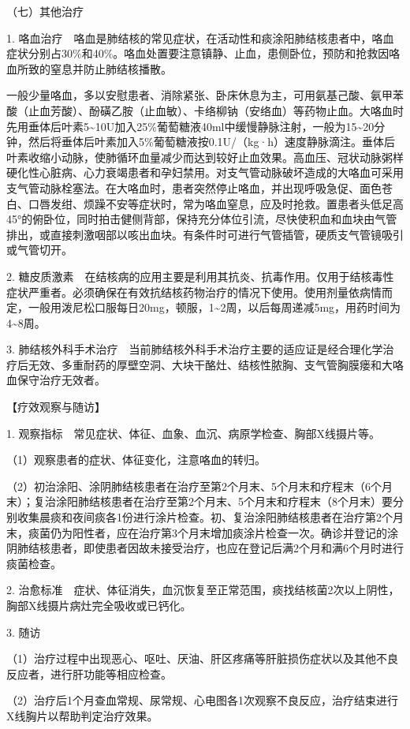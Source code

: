 {（七）其他治疗}

1.
咯血治疗　咯血是肺结核的常见症状，在活动性和痰涂阳肺结核患者中，咯血症状分别占30\%和40\%。咯血处置要注意镇静、止血，患侧卧位，预防和抢救因咯血所致的窒息并防止肺结核播散。

一般少量咯血，多以安慰患者、消除紧张、卧床休息为主，可用氨基己酸、氨甲苯酸（止血芳酸）、酚磺乙胺（止血敏）、卡络柳钠（安络血）等药物止血。大咯血时先用垂体后叶素5\textasciitilde{}10U加入25\%葡萄糖液40ml中缓慢静脉注射，一般为15\textasciitilde{}20分钟，然后将垂体后叶素加入5\%葡萄糖液按0.1U/（kg·h）速度静脉滴注。垂体后叶素收缩小动脉，使肺循环血量减少而达到较好止血效果。高血压、冠状动脉粥样硬化性心脏病、心力衰竭患者和孕妇禁用。对支气管动脉破坏造成的大咯血可采用支气管动脉栓塞法。在大咯血时，患者突然停止咯血，并出现呼吸急促、面色苍白、口唇发绀、烦躁不安等症状时，常为咯血窒息，应及时抢救。置患者头低足高45°的俯卧位，同时拍击健侧背部，保持充分体位引流，尽快使积血和血块由气管排出，或直接刺激咽部以咳出血块。有条件时可进行气管插管，硬质支气管镜吸引或气管切开。

2.
糖皮质激素　在结核病的应用主要是利用其抗炎、抗毒作用。仅用于结核毒性症状严重者。必须确保在有效抗结核药物治疗的情况下使用。使用剂量依病情而定，一般用泼尼松口服每日20mg，顿服，1\textasciitilde{}2周，以后每周递减5mg，用药时间为4\textasciitilde{}8周。

3.
肺结核外科手术治疗　当前肺结核外科手术治疗主要的适应证是经合理化学治疗后无效、多重耐药的厚壁空洞、大块干酪灶、结核性脓胸、支气管胸膜瘘和大咯血保守治疗无效者。

【疗效观察与随访】

1. 观察指标　常见症状、体征、血象、血沉、病原学检查、胸部X线摄片等。

（1）观察患者的症状、体征变化，注意咯血的转归。

（2）初治涂阳、涂阴肺结核患者在治疗至第2个月末、5个月末和疗程末（6个月末）；复治涂阳肺结核患者在治疗至第2个月末、5个月末和疗程末（8个月末）要分别收集晨痰和夜间痰各1份进行涂片检查。初、复治涂阳肺结核患者在治疗第2个月末，痰菌仍为阳性者，应在治疗第3个月末增加痰涂片检查一次。确诊并登记的涂阴肺结核患者，即使患者因故未接受治疗，也应在登记后满2个月和满6个月时进行痰菌检查。

2.
治愈标准　症状、体征消失，血沉恢复至正常范围，痰找结核菌2次以上阴性，胸部X线摄片病灶完全吸收或已钙化。

3. 随访

（1）治疗过程中出现恶心、呕吐、厌油、肝区疼痛等肝脏损伤症状以及其他不良反应者，进行肝功能等相应检查。

（2）治疗后1个月查血常规、尿常规、心电图各1次观察不良反应，治疗结束进行X线胸片以帮助判定治疗效果。

